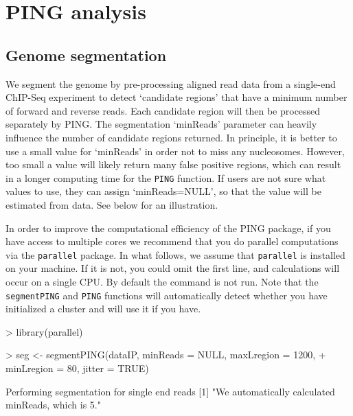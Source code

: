 \documentclass[11pt]{article}
\begin{document}


\section{PING analysis}

\subsection{Genome segmentation}
We segment the genome by pre-processing aligned read data from a single-end
ChIP-Seq experiment to detect `candidate regions' that have a minimum number of
forward and reverse reads. Each candidate region will then be processed
separately by PING. The segmentation `minReads' parameter can heavily influence
the number of candidate regions returned. In principle, it is better to use a
small value for `minReads' in order not to miss any nucleosomes. However, too
small a value will likely return many false positive regions, which can result
in a longer computing time for the \texttt{PING} function. 
If users are not sure what values to use, they can assign `minReads=NULL', so
that the value will be estimated from data. See below for an illustration.

In order to improve the computational efficiency of the PING package, if you
have access to multiple cores we recommend that you do parallel computations via
the \texttt{parallel} package.
In what follows, we assume that \texttt{parallel} is installed on your machine.
If it is not, you could omit the first line, and calculations will occur on a
single CPU.
By default the command is not run. Note that the \texttt{segmentPING} and
\texttt{PING} functions will automatically detect whether you have initialized a
cluster and will use it if you have.

\begin{Schunk}
\begin{Sinput}
> library(parallel)
\end{Sinput}
\end{Schunk}


\begin{Schunk}
\begin{Sinput}
> seg <- segmentPING(dataIP, minReads = NULL, maxLregion = 1200, 
+     minLregion = 80, jitter = TRUE)
\end{Sinput}
\begin{Soutput}
Performing segmentation for single end reads
[1] "We automatically calculated minReads, which is 5."
\end{Soutput}
\end{Schunk}
\end{document}
